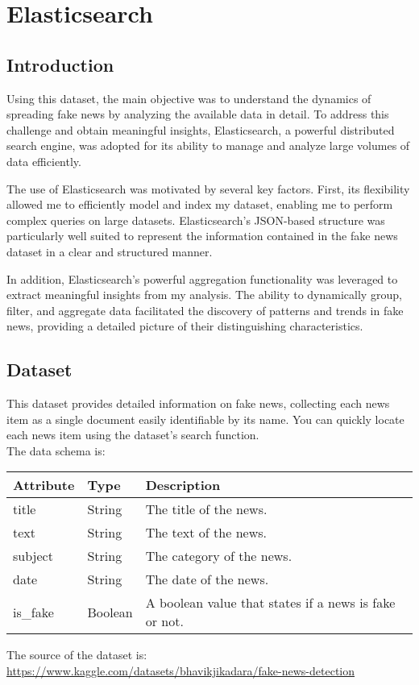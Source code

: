 \chapter{Elasticsearch}
\label{ch:mongodb}%

\section{Introduction}
Using this dataset, the main objective was to understand the dynamics of spreading fake news by analyzing the available data in detail. To address this challenge and obtain meaningful insights, Elasticsearch, a powerful distributed search engine, was adopted for its ability to manage and analyze large volumes of data efficiently.

The use of Elasticsearch was motivated by several key factors. First, its flexibility allowed me to efficiently model and index my dataset, enabling me to perform complex queries on large datasets. Elasticsearch's JSON-based structure was particularly well suited to represent the information contained in the fake news dataset in a clear and structured manner.

In addition, Elasticsearch's powerful aggregation functionality was leveraged to extract meaningful insights from my analysis. The ability to dynamically group, filter, and aggregate data facilitated the discovery of patterns and trends in fake news, providing a detailed picture of their distinguishing characteristics.

\section{Dataset}
This dataset provides detailed information on fake news, collecting each news item as a single document easily identifiable by its name. You can quickly locate each news item using the dataset's search function. \\
The data schema is:
\begin{table}[h!]
	\begin{center}
		\begin{tabular}{|m{6em}|m{4em}|m{20em}|}
		\hline
		\textbf{Attribute} & \textbf{Type} & \textbf{Description}\\
		\hline
			title & String & The title of the news.\\
		\hline
			text & String & The text of the news.\\
            \hline
			subject & String & The category of the news.\\
		\hline
                date & String & The date of the news.\\
            \hline
                is\_fake & Boolean & A boolean value that states if a news is fake or not.\\
            \hline
		\end{tabular}
	\end{center}
\end{table}
The source of the dataset is:\\
\url{https://www.kaggle.com/datasets/bhavikjikadara/fake-news-detection}
\newpage
